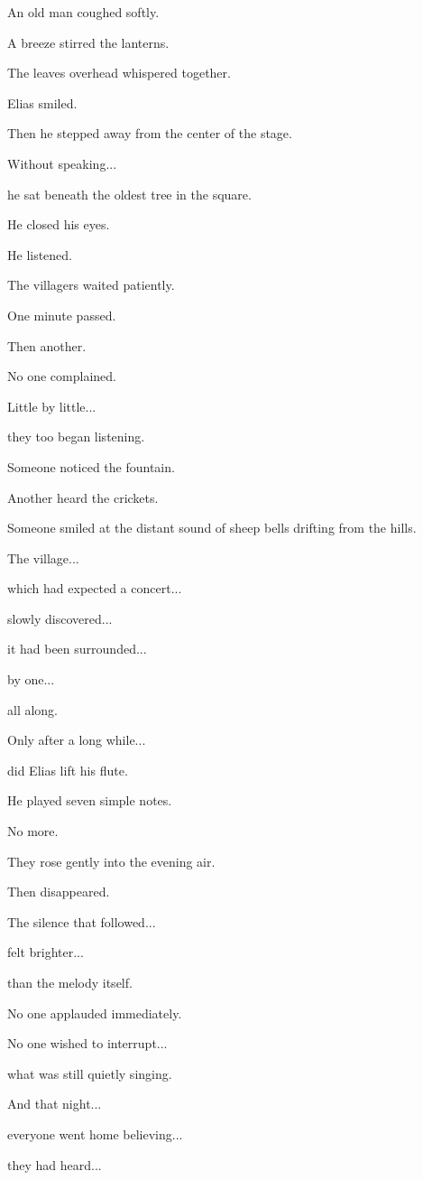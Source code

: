 \documentclass[12pt,openany]{book}
\begin{document}
An old man coughed softly.

A breeze stirred the lanterns.

The leaves overhead whispered together.

Elias smiled.

Then he stepped away from the center of the stage.

Without speaking...

he sat beneath the oldest tree in the square.

He closed his eyes.

He listened.

The villagers waited patiently.

One minute passed.

Then another.

No one complained.

Little by little...

they too began listening.

Someone noticed the fountain.

Another heard the crickets.

Someone smiled at the distant sound of sheep bells drifting from the hills.

The village...

which had expected a concert...

slowly discovered...

it had been surrounded...

by one...

all along.

Only after a long while...

did Elias lift his flute.

He played seven simple notes.

No more.

They rose gently into the evening air.

Then disappeared.

The silence that followed...

felt brighter...

than the melody itself.

No one applauded immediately.

No one wished to interrupt...

what was still quietly singing.

And that night...

everyone went home believing...

they had heard...
\end{document}
